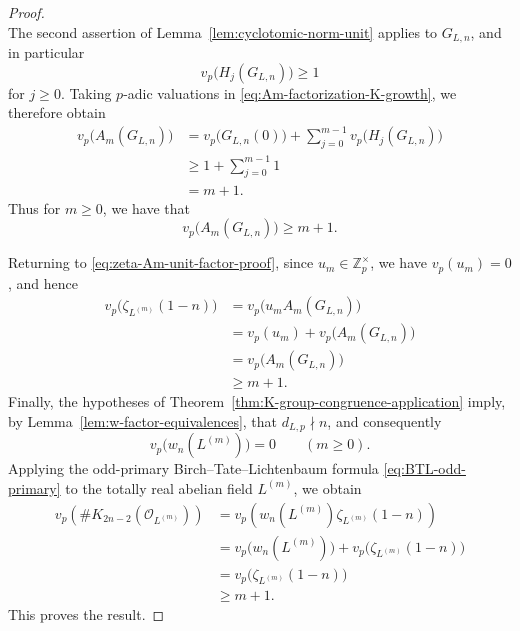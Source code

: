 \documentclass[11pt,table]{amsart}
\numberwithin{equation}{section}
\begin{document}
\begin{proof}
\begin{equation}
        \label{eq:Am-factorization-K-growth}
\end{equation}
The second assertion of
Lemma~\ref{lem:cyclotomic-norm-unit} applies to \(G_{L,n}\), and in particular
\[
        v_p\bigl(H_j(G_{L,n})\bigr)\geq1
\]
for $j\geq 0$. Taking \(p\)-adic valuations in
\eqref{eq:Am-factorization-K-growth}, we therefore obtain
\[
\begin{aligned}
        v_p\bigl(A_m(G_{L,n})\bigr)
        &=
        v_p\bigl(G_{L,n}(0)\bigr)
        +
        \sum_{j=0}^{m-1}
        v_p\bigl(H_j(G_{L,n})\bigr)\\
        &\geq
        1+\sum_{j=0}^{m-1}1\\
        &=
        m+1.
\end{aligned}
\]
Thus for $m\geq 0$, we have that
\begin{equation}
        v_p\bigl(A_m(G_{L,n})\bigr)\geq m+1.
        \label{eq:Am-growth-K}
\end{equation}

Returning to \eqref{eq:zeta-Am-unit-factor-proof}, since
\(u_m\in\mathbb Z_p^\times\), we have \(v_p(u_m)=0\), and hence
\[
\begin{aligned}
        v_p\bigl(\zeta_{L^{(m)}}(1-n)\bigr)
        &=
        v_p\bigl(u_mA_m(G_{L,n})\bigr)\\
        &=
        v_p(u_m)
        +
        v_p\bigl(A_m(G_{L,n})\bigr)\\
        &=
        v_p\bigl(A_m(G_{L,n})\bigr)\\
        &\geq m+1.
\end{aligned}
\]
Finally, the hypotheses of
Theorem~\ref{thm:K-group-congruence-application} imply, by
Lemma~\ref{lem:w-factor-equivalences}, that $d_{L,p}\nmid n$,
and consequently
\[
        v_p\bigl(w_n(L^{(m)})\bigr)=0
        \qquad(m\geq0).
\]
Applying the odd-primary Birch--Tate--Lichtenbaum formula
\eqref{eq:BTL-odd-primary} to the totally real abelian field
\(L^{(m)}\), we obtain
\[
\begin{aligned}
        v_p\!\left(
        \#K_{2n-2}(\mathcal O_{L^{(m)}})
        \right)
        &=
        v_p\!\left(
        w_n(L^{(m)})
        \zeta_{L^{(m)}}(1-n)
        \right)\\
        &=
        v_p\bigl(w_n(L^{(m)})\bigr)
        +
        v_p\bigl(\zeta_{L^{(m)}}(1-n)\bigr)\\
        &=
        v_p\bigl(\zeta_{L^{(m)}}(1-n)\bigr)\\
        &\geq m+1.
\end{aligned}
\]
This proves the result.
\end{proof}
\end{document}
